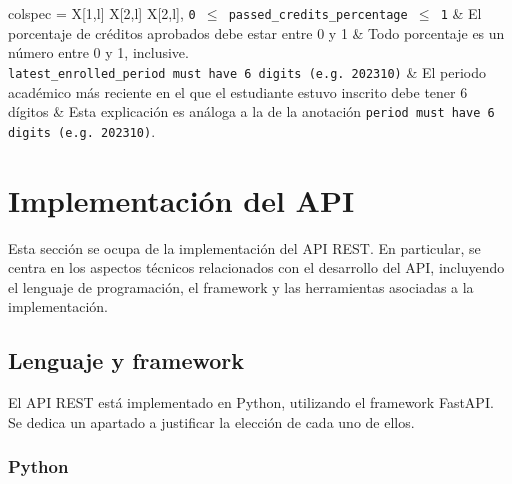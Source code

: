 \begin{longtblr}[
		caption = {Anotaciones del diagrama de clases y su significado},
		label = {tab:anotaciones},
	]{
		colspec = {X[1,l] X[2,l] X[2,l]},
	}
	\texttt{0 \ensuremath{\leq} passed\_credits\_percentage \ensuremath{\leq} 1} & El porcentaje de créditos aprobados debe estar entre 0 y 1                                                                 & Todo porcentaje es un número entre 0 y 1, inclusive.                                                                                                                                                                                                               \\
	\texttt{latest\_enrolled\_period must have 6 digits (e.g. 202310)}           & El periodo académico más reciente en el que el estudiante estuvo inscrito debe tener 6 dígitos                             & Esta explicación es análoga a la de la anotación \lstinline|period must have 6 digits (e.g. 202310)|.                                                                                                                                                              \\
	\hline
\end{longtblr}

\section{Implementación del API}

Esta sección se ocupa de la implementación del \gls{API REST}. En particular, se centra en los aspectos técnicos relacionados con el desarrollo del \gls{API}, incluyendo el lenguaje de programación, el framework y las herramientas asociadas a la implementación.

\subsection{Lenguaje y framework}

El \gls{API REST} está implementado en \gls{Python}, utilizando el framework \gls{FastAPI}. Se dedica un apartado a justificar la elección de cada uno de ellos.

\subsubsection{Python}


